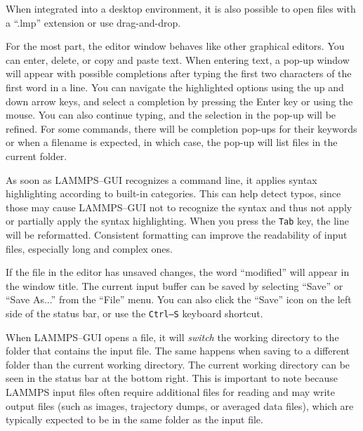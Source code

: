 \documentclass[9pt,tutorial]{livecoms}
\begin{document}
\begin{appendices}
When integrated into a desktop environment, it is also possible to open
files with a ``.lmp'' extension or use drag-and-drop.

For the most part, the editor window behaves like other graphical
editors.  You can enter, delete, or copy and paste text.   When entering
text, a pop-up window will appear with possible completions after typing
the first two characters of the first word in a line.  You can
navigate the highlighted options using the up and down arrow keys, and select a
completion by pressing the Enter key or using the mouse.  You can also continue
typing, and the selection in the pop-up will be refined.  For some
commands, there will be completion pop-ups for their
keywords or when a filename is expected, in which case,
the pop-up will list files in the current folder.

As soon as LAMMPS--GUI recognizes a command line, it applies syntax
highlighting according to built-in categories.  This can help
detect typos, since those may cause LAMMPS--GUI not to
recognize the syntax and thus not apply or partially apply
the syntax highlighting.  When you press the \texttt{Tab} key, the line will be
reformatted.  Consistent formatting can improve the readability of
input files, especially long and complex ones.

If the file in the editor has unsaved changes, the word 
``\*modified\*'' will appear in the window title.  The current input
buffer can be saved by selecting ``Save'' or ``Save As...'' from the
``File'' menu.  You can also click the ``Save'' icon on the left side
of the status bar, or use the \texttt{Ctrl--S} keyboard shortcut.

\begin{note}
When LAMMPS--GUI opens a file, it will \emph{switch} the working directory
to the folder that contains the input file.  The same happens when saving to
a different folder than the current working directory.  The current working
directory can be seen in the status bar at the bottom right.  This is important
to note because LAMMPS input files often require additional files for reading and may
write output files (such as images, trajectory dumps, or averaged data files),
which are typically expected to be in the same folder as the input file.
\end{note}



\end{appendices}
\end{document}
